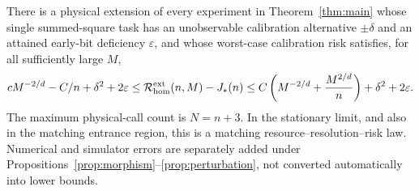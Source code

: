 \begin{corollary}\label{cor:joint}
There is a physical extension of every experiment in Theorem~\ref{thm:main} whose single summed-square task has an unobservable calibration alternative $\pm\delta$ and an attained early-bit deficiency $\varepsilon$, and whose worst-case calibration risk satisfies, for all sufficiently large $M$,
\begin{equation}\label{eq:joint}
 cM^{-2/d}-C/n+\delta^2+2\varepsilon
 \le\mathcal R^{\rm ext}_{\rm hom}(n,M)-J_*(n)
 \le C\left(M^{-2/d}+\frac{M^{2/d}}n\right)+\delta^2+2\varepsilon.
\end{equation}
The maximum physical-call count is $N=n+3$. In the stationary limit, and also in the matching entrance region, this is a matching resource--resolution--risk law. Numerical and simulator errors are separately added under Propositions~\ref{prop:morphism}--\ref{prop:perturbation}, not converted automatically into lower bounds.
\end{corollary}
